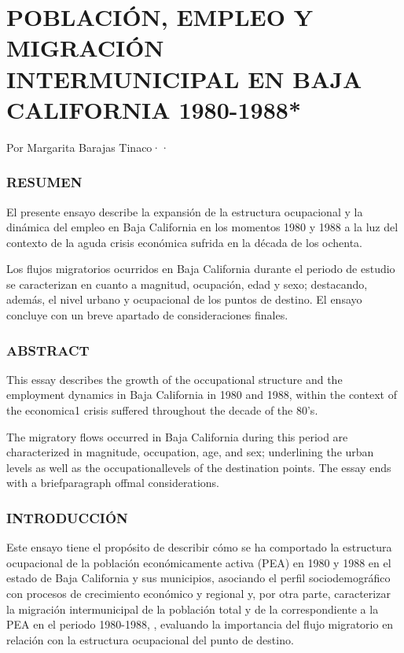 \documentclass{article}
\begin{document}
\section{\textbf{POBLACIÓN, EMPLEO Y MIGRACIÓN INTERMUNICIPAL EN BAJA CALIFORNIA 1980-1988}*}

Por Margarita Barajas Tinaco··

\subsubsection{RESUMEN}

El presente ensayo describe la expansión de la estructura ocupacional y la dinámica del empleo en Baja California en los momentos 1980 y 1988 a la luz del contexto de la aguda crisis económica sufrida en la década de los ochenta.

Los flujos migratorios ocurridos en Baja California durante el periodo de estudio se caracterizan en cuanto a magnitud, ocupación, edad y sexo; destacando, además, el nivel urbano y ocupacional de los puntos de destino. El ensayo concluye con un breve apartado de consideraciones finales.

\subsubsection{ABSTRACT}

This essay describes the growth of the occupational structure and the employment dynamics in Baja California in 1980 and 1988, within the context of the economica1 crisis suffered throughout the decade of the 80's.

The migratory flows occurred in Baja California during this period are characterized in magnitude, occupation, age, and sex; underlining the urban levels as well as the occupationallevels of the destination points. The essay ends with a briefparagraph offmal considerations.

\subsubsection{INTRODUCCIÓN}

Este ensayo tiene el propósito de describir cómo se ha comportado la estructura ocupacional de la población económicamente activa (PEA) en 1980 y 1988 en el estado de Baja California y sus municipios, asociando el perfil sociodemográfico con procesos de crecimiento económico y regional y, por otra parte, caracterizar la migración intermunicipal de la población total y de la correspondiente a la PEA en el periodo 1980-1988, , evaluando la importancia del flujo migratorio en relación con la estructura ocupacional del punto de destino.
\end{document}
